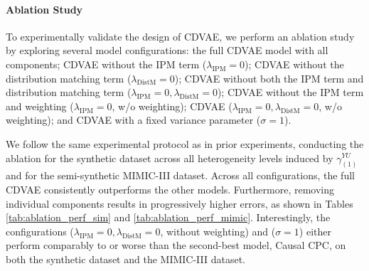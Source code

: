\documentclass[10pt]{article} %
\begin{document}
\paragraph{Ablation Study} To experimentally validate the design of CDVAE, we perform an ablation study by exploring several model configurations: the full CDVAE model with all components; CDVAE without the IPM term (\(\lambda_{\mathrm{IPM}} = 0\)); CDVAE without the distribution matching term (\(\lambda_{\mathrm{DistM}} = 0\)); CDVAE without both the IPM term and distribution matching term (\(\lambda_{\mathrm{IPM}} = 0, \lambda_{\mathrm{DistM}} = 0\)); CDVAE without the IPM term and weighting (\(\lambda_{\mathrm{IPM}} = 0\), w/o weighting); CDVAE (\(\lambda_{\mathrm{IPM}} = 0, \lambda_{\mathrm{DistM}} = 0\), w/o weighting); and CDVAE with a fixed variance parameter (\(\sigma = 1\)).
\begin{table} %
    \centering
    \caption{CDVAE ablation study with semi-synthetic MIMIC-III data reported by PEHE. Smaller is better.}
    \label{tab:ablation_perf_mimic}
\end{table}
We follow the same experimental protocol as in prior experiments, conducting the ablation for the synthetic dataset across all heterogeneity levels induced by \(\gamma_{(1)}^{YU}\) and for the semi-synthetic MIMIC-III dataset. Across all configurations, the full CDVAE consistently outperforms the other models. Furthermore, removing individual components results in progressively higher errors, as shown in Tables \ref{tab:ablation_perf_sim} and \ref{tab:ablation_perf_mimic}. Interestingly, the configurations (\(\lambda_{\mathrm{IPM}} = 0, \lambda_{\mathrm{DistM}} = 0\), without weighting) and (\(\sigma = 1\)) either perform comparably to or worse than the second-best model, Causal CPC, on both the synthetic dataset and the MIMIC-III dataset.  %
\end{document}
